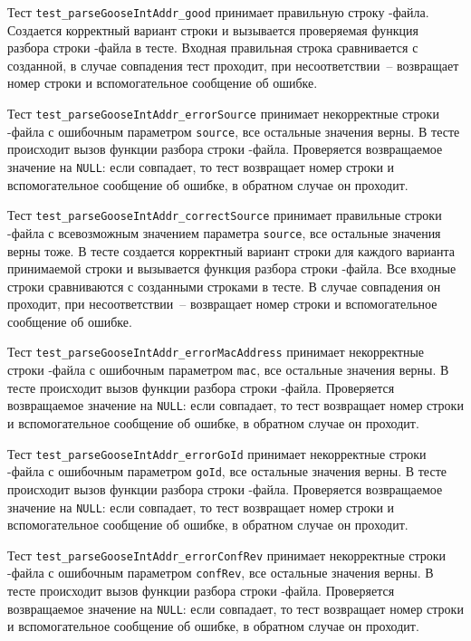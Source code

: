 Тест \lstinline{test_parseGooseIntAddr_good} принимает правильную строку \cid-файла. Создается корректный вариант строки и вызывается проверяемая функция разбора строки \cid-файла в тесте. Входная правильная строка сравнивается с созданной, в случае совпадения тест проходит, при несоответствии~-- возвращает номер строки и вспомогательное сообщение  об ошибке.

Тест \lstinline{test_parseGooseIntAddr_errorSource} принимает некорректные строки \cid-файла с ошибочным параметром \lstinline{source}, все остальные значения верны. В тесте происходит вызов функции разбора строки \cid-файла. Проверяется возвращаемое значение на \lstinline{NULL}: если совпадает, то тест возвращает номер строки и вспомогательное сообщение об ошибке, в обратном случае он проходит.

Тест \lstinline{test_parseGooseIntAddr_correctSource} принимает правильные строки \cid-файла с всевозможным значением параметра \lstinline{source}, все остальные значения верны тоже. В тесте создается корректный вариант строки для каждого варианта принимаемой строки и вызывается функция разбора строки \cid-файла. Все входные строки сравниваются с созданными строками в тесте. В случае совпадения он проходит, при несоответствии~-- возвращает номер строки и вспомогательное сообщение  об ошибке.

Тест \lstinline{test_parseGooseIntAddr_errorMacAddress} принимает некорректные строки \cid-файла с ошибочным параметром \lstinline{mac}, все остальные значения верны. В тесте происходит вызов функции разбора строки \cid-файла. Проверяется возвращаемое значение на \lstinline{NULL}: если совпадает, то тест возвращает номер строки и вспомогательное сообщение об ошибке, в обратном случае он проходит.

Тест \lstinline{test_parseGooseIntAddr_errorGoId} принимает некорректные строки \cid-файла с ошибочным параметром \lstinline{goId}, все остальные значения верны. В тесте происходит вызов функции разбора строки \cid-файла. Проверяется возвращаемое значение на \lstinline{NULL}: если совпадает, то тест возвращает номер строки и вспомогательное сообщение об ошибке, в обратном случае он проходит.

Тест \lstinline{test_parseGooseIntAddr_errorConfRev} принимает некорректные строки \cid-файла с ошибочным параметром \lstinline{confRev}, все остальные значения верны. В тесте происходит вызов функции разбора строки \cid-файла. Проверяется возвращаемое значение на \lstinline{NULL}: если совпадает, то тест возвращает номер строки и вспомогательное сообщение об ошибке, в обратном случае он проходит.

